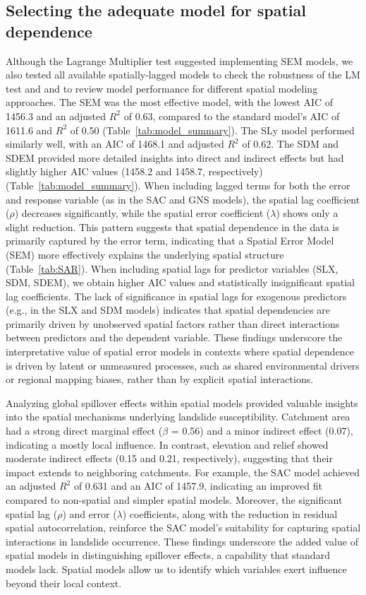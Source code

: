 \documentclass[lineno,pdflatex,sn-basic]{sn-jnl}%
\theoremstyle{thmstyleone}%
\theoremstyle{thmstyletwo}%
\theoremstyle{thmstylethree}%
\begin{document}
\subsection{Selecting the adequate model for spatial dependence}
Although the Lagrange Multiplier test suggested implementing SEM models, we also tested all available spatially-lagged models to check the robustness of the LM test and and to review model performance for different spatial modeling approaches.
The SEM was the most effective model, with the lowest AIC of 1456.3 and an adjusted $R^2$ of 0.63, compared to the standard model’s AIC of 1611.6 and $R^2$ of 0.50 (Table~\ref{tab:model_summary}). 
The SLy model performed similarly well, with an AIC of 1468.1 and adjusted $R^2$ of 0.62. 
The SDM and SDEM provided more detailed insights into direct and indirect effects but had slightly higher AIC values (1458.2 and 1458.7, respectively)(Table~\ref{tab:model_summary}).
When including lagged terms for both the error and response variable (as in the SAC and GNS models), the spatial lag coefficient ($\rho$) decreases significantly, while the spatial error coefficient ($\lambda$) shows only a slight reduction. 
This pattern suggests that spatial dependence in the data is primarily captured by the error term, indicating that a Spatial Error Model (SEM) more effectively explains the underlying spatial structure (Table~\ref{tab:SAR}). 
When including spatial lags for predictor variables (SLX, SDM, SDEM), we obtain higher AIC values and statistically insignificant spatial lag coefficients.
The lack of significance in spatial lags for exogenous predictors (e.g., in the SLX and SDM models) indicates that spatial dependencies are primarily driven by unobserved spatial factors rather than direct interactions between predictors and the dependent variable. 
These findings underscore the interpretative value of spatial error models in contexts where spatial dependence is driven by latent or unmeasured processes, such as shared environmental drivers or regional mapping biases, rather than by explicit spatial interactions. 

Analyzing global spillover effects within spatial models provided valuable insights into the spatial mechanisms underlying landslide susceptibility.  
Catchment area had a strong direct marginal effect ($\beta$ = 0.56) and a minor indirect effect (0.07), indicating a mostly local influence. 
In contrast, elevation and relief showed moderate indirect effects (0.15 and 0.21, respectively), suggesting that their impact extends to neighboring catchments. 
For example, the SAC model achieved an adjusted $R^2$ of 0.631 and an AIC of 1457.9, indicating an improved fit compared to non-spatial and simpler spatial models. Moreover, the significant spatial lag ($\rho$) and error ($\lambda$) coefficients, along with the reduction in residual spatial autocorrelation, reinforce the SAC model’s suitability for capturing spatial interactions in landslide occurrence. 
These findings underscore the added value of spatial models in distinguishing spillover effects, a capability that standard models lack.
Spatial models allow us to identify which variables exert influence beyond their local context.
\end{document}
